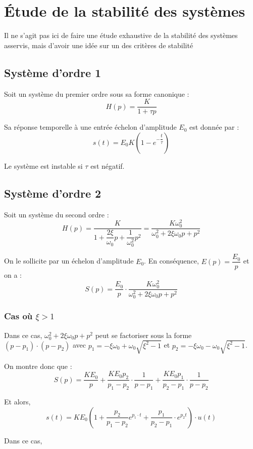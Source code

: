 \documentclass[10pt,oneside]{article}
\begin{document}
\section{Étude de la stabilité des systèmes}
Il ne s'agit pas ici de faire une étude exhaustive de la stabilité des systèmes asservis, mais d'avoir une idée sur un des critères de stabilité
\subsection{Système d'ordre 1}
Soit un système du premier ordre sous sa forme canonique :
$$
H(p)=\dfrac{K}{1+\tau p}
$$

Sa réponse temporelle à une entrée échelon d'amplitude $E_0$ est donnée par :
$$
s(t) = E_0 K \left(1-e^{-\dfrac{t}{\tau}}\right)
$$

Le système est instable si $\tau$ est négatif.

\subsection{Système d'ordre 2}
Soit un système du second ordre :
$$
H(p)
=\dfrac{K}{1+\dfrac{2\xi}{\omega_0} p+\dfrac{1}{\omega_0^2} p^2}
=\dfrac{K\omega_0^2}{\omega_0^2+2\xi\omega_0 p+ p^2}
$$


On le sollicite par un échelon d'amplitude $E_0$. En conséquence, $E(p)=\dfrac{E_0}{p}$ et on a :
$$
S(p)=\dfrac{E_0}{p} \cdot \dfrac{K\omega_0^2}{\omega_0^2+2\xi\omega_0 p+ p^2}
$$

\subsubsection{Cas où $\xi>1$}
Dans ce cas, $\omega_0^2+2\xi\omega_0 p+ p^2$ peut se factoriser sous la forme $\left(p-p_1\right)\cdot\left(p-p_2\right)$ avec $p_1 = -\xi\omega_0 + \omega_0 \sqrt{\xi^2-1}$ et $p_2 = -\xi\omega_0 - \omega_0 \sqrt{\xi^2-1}$.

On montre donc que :
$$
S(p)= \dfrac{KE_0}{p} + \dfrac{KE_0 p_2}{p_1-p_2}\cdot \dfrac{1}{p-p_1}
+ \dfrac{KE_0 p_1}{p_2-p_1}\cdot \dfrac{1}{p-p_2}
$$

Et alors, 
$$
s(t) = KE_0\left(1+ \dfrac{ p_2}{p_1-p_2} e^{p_1 \cdot t} + \dfrac{p_1}{p_2-p_1}\cdot e^{p_2 t} \right) \cdot u(t)
$$


Dans ce cas, 
\end{document}
